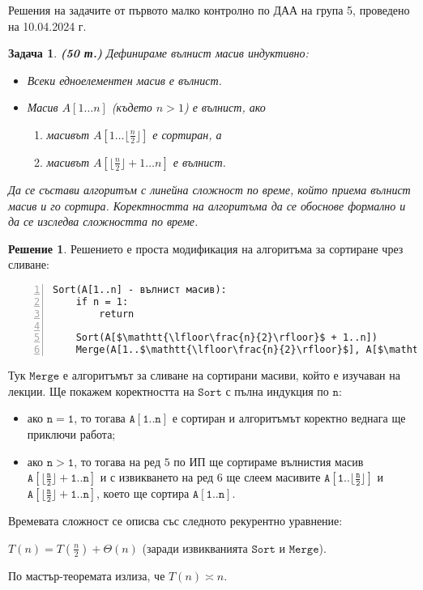 \documentclass{article}
\newtheorem{problem}{Задача}
\theoremstyle{definition}
\newtheorem*{solution}{Решение}
\begin{document}
\begin{center}
    \Large{Решения на задачите от първото малко контролно по ДАА на група 5, проведено на 10.04.2024 г.}
\end{center}

\vspace*{4mm}

\begin{problem} {\bf (50 т.)}
Дефинираме \textit{вълнист масив} индуктивно:
\begin{itemize}
    \item Всеки едноелементен масив е вълнист.
    \item Масив $A[1 \dots n]$ (където $n > 1$) е вълнист, ако
          \begin{enumerate}
              \item масивът $A[1 \dots \lfloor \frac{n}{2} \rfloor]$ е сортиран, а
              \item масивът $A[\lfloor \frac{n}{2} \rfloor + 1 \dots n]$ е вълнист.
          \end{enumerate}
\end{itemize}
Да се състави алгоритъм с линейна сложност по време, който приема вълнист масив и го сортира.
Коректността на алгоритъма да се обоснове формално и да се изследва сложността по време.
\end{problem}

\begin{solution}
    Решението е проста модификация на алгоритъма за сортиране чрез сливане:
    \begin{Verbatim}[frame=single, numbers=left,commandchars=\\\{\},codes={\catcode`$=3}]
Sort(A[1..n] - вълнист масив):
    if n = 1:
        return

    Sort(A[$\mathtt{\lfloor\frac{n}{2}\rfloor}$ + 1..n])
    Merge(A[1..$\mathtt{\lfloor\frac{n}{2}\rfloor}$], A[$\mathtt{\lfloor\frac{n}{2}\rfloor}$ + 1..n])
    \end{Verbatim}
    Тук $\mathtt{Merge}$ е алгоритъмът за сливане на сортирани масиви, който е изучаван на лекции.
    Ще покажем коректността на $\mathtt{Sort}$ с пълна индукция по $\mathtt{n}$:
    \begin{itemize}
        \item ако $\mathtt{n = 1}$, то тогава $\mathtt{A[1..n]}$ е сортиран и алгоритъмът коректно веднага ще приключи работа;
        \item ако $\mathtt{n > 1}$, то тогава на ред $5$ по ИП ще сортираме вълнистия масив $\mathtt{A[\lfloor\frac{n}{2}\rfloor + 1..n]}$ и с извикването на ред $6$ ще слеем масивите $\mathtt{A[1..\lfloor\frac{n}{2}\rfloor]}$ и $\mathtt{A[\lfloor\frac{n}{2}\rfloor + 1..n]}$, което ще сортира $\mathtt{A[1..n]}$.
    \end{itemize}
    Времевата сложност се описва със следното рекурентно уравнение:
    \begin{center}
        $T(n) = T(\frac{n}{2}) + \Theta(n)$ (заради извикванията $\mathtt{Sort}$ и $\mathtt{Merge}$).
    \end{center}
    По мастър-теоремата излиза, че $T(n) \asymp n$.
\end{solution}
\end{document}
